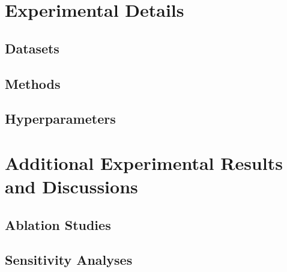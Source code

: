 \section{Experimental Details}\label{app:setup}

\subsection{Datasets}\label{app:setup:datasets}

\subsection{Methods}\label{app:setup:methods}

\subsection{Hyperparameters}\label{app:setup:hyperparameters}

\section{%
    Additional Experimental Results and Discussions
}\label{app:results}

\subsection{Ablation Studies}\label{app:results:ablation}

\subsection{Sensitivity Analyses}\label{app:results:sensitivity}
